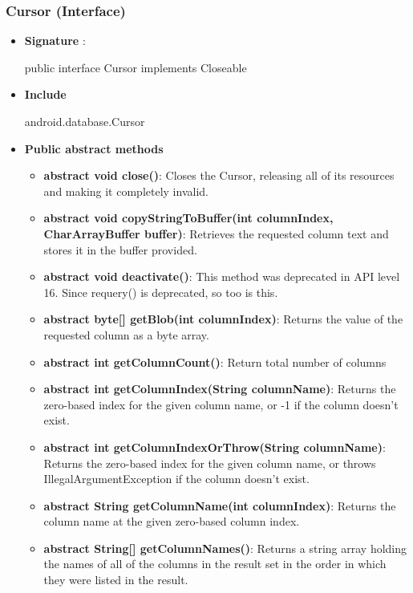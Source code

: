 \documentclass{report}
\begin{document}
\begin{itemize}
    \subsubsection{Cursor (Interface)}
    \begin{itemize}
        \item \textbf{Signature} :
            \bigbreak \noindent 
            \begin{javacode}
                public interface Cursor implements Closeable
            \end{javacode}
        \item \textbf{Include}
            \bigbreak \noindent 
            \begin{javacode}
            android.database.Cursor
            \end{javacode}
        \item \textbf{Public abstract methods}
            \begin{itemize}
                \item \textbf{abstract void	close()}: Closes the Cursor, releasing all of its resources and making it completely invalid.
                \item \textbf{abstract void	copyStringToBuffer(int columnIndex, CharArrayBuffer buffer)}: Retrieves the requested column text and stores it in the buffer provided.
                \item \textbf{abstract void	deactivate()}: This method was deprecated in API level 16. Since requery() is deprecated, so too is this.
                \item \textbf{abstract byte[]	getBlob(int columnIndex)}: Returns the value of the requested column as a byte array.
                \item \textbf{abstract int	getColumnCount()}: Return total number of columns
                \item \textbf{abstract int	getColumnIndex(String columnName)}: Returns the zero-based index for the given column name, or -1 if the column doesn't exist.
                \item \textbf{abstract int	getColumnIndexOrThrow(String columnName)}: Returns the zero-based index for the given column name, or throws IllegalArgumentException if the column doesn't exist.
                \item \textbf{abstract String	getColumnName(int columnIndex)}: Returns the column name at the given zero-based column index.
                \item \textbf{abstract String[]	getColumnNames()}: Returns a string array holding the names of all of the columns in the result set in the order in which they were listed in the result.

\end{itemize}
\end{itemize}
\end{itemize}
\end{document}
